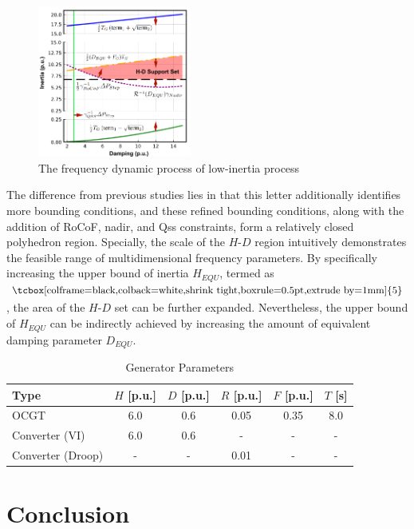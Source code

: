\documentclass[lettersize,journal]{IEEEtran}
\newcommand{\ciao}[1]{{\setlength\fboxrule{0pt}\fbox{\tcbox[colframe=black,colback=white,shrink tight,boxrule=0.5pt,extrude by=1mm]{\small #1}}}}
\begin{document}
\begin{figure}[h]
  \centering
  \includegraphics[width=0.45\textwidth]{inertia_damping_supportset.pdf}
  \caption{The frequency dynamic process of low-inertia process}\vspace{-0.125cm}
  \label{fig:inertia_damping_supportset}
\end{figure}

The difference from previous studies lies in that this letter additionally identifies more bounding conditions, and these refined bounding conditions, along with the addition of RoCoF, nadir, and Qss constraints, form a relatively closed polyhedron region.  Specially, the scale of the $H$-$D$ region intuitively demonstrates the feasible range of multidimensional frequency  parameters. By specifically increasing the upper bound of inertia $H_{EQU}$, termed as $\ciao{5}$, the area of the $H$-$D$ set can be further expanded. Nevertheless, the upper bound of $H_{EQU}$ can be indirectly achieved by increasing the amount of equivalent damping parameter $D_{EQU}$.





\begin{table}[!t]
  \centering
  \caption{Generator Parameters}
  \begin{tabular}{lccccc}
      \hline
      \textbf{Type} & $H$ [p.u.] & $D$ [p.u.] & $R$ [p.u.] & $F$ [p.u.] & $T$ [s] \\
      \hline
      OCGT & 6.0 & 0.6 & 0.05 & 0.35 & 8.0 \\
      Converter (VI) & 6.0 & 0.6 & - & - & - \\
      Converter (Droop) & - & - & 0.01 & - & - \\
      \hline
  \end{tabular}
  \label{tab:generator_parameters}
\end{table}



\section{Conclusion}
\end{document}
